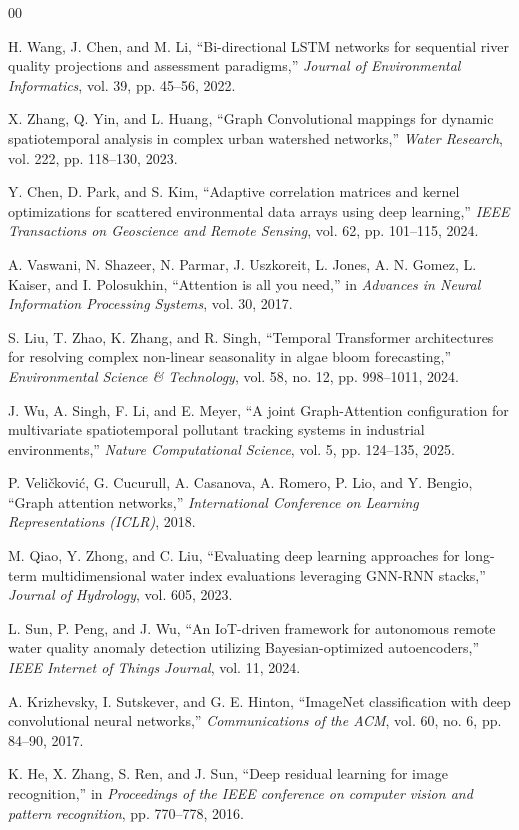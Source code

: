 \documentclass[journal,10pt,twocolumn]{IEEEtran}
\begin{document}
\begin{thebibliography}{00}

 H. Wang, J. Chen, and M. Li, ``Bi-directional LSTM networks for sequential river quality projections and assessment paradigms,'' \textit{Journal of Environmental Informatics}, vol. 39, pp. 45--56, 2022.

 X. Zhang, Q. Yin, and L. Huang, ``Graph Convolutional mappings for dynamic spatiotemporal analysis in complex urban watershed networks,'' \textit{Water Research}, vol. 222, pp. 118--130, 2023.

 Y. Chen, D. Park, and S. Kim, ``Adaptive correlation matrices and kernel optimizations for scattered environmental data arrays using deep learning,'' \textit{IEEE Transactions on Geoscience and Remote Sensing}, vol. 62, pp. 101--115, 2024.

 A. Vaswani, N. Shazeer, N. Parmar, J. Uszkoreit, L. Jones, A. N. Gomez, L. Kaiser, and I. Polosukhin, ``Attention is all you need,'' in \textit{Advances in Neural Information Processing Systems}, vol. 30, 2017.

 S. Liu, T. Zhao, K. Zhang, and R. Singh, ``Temporal Transformer architectures for resolving complex non-linear seasonality in algae bloom forecasting,'' \textit{Environmental Science \& Technology}, vol. 58, no. 12, pp. 998--1011, 2024.

 J. Wu, A. Singh, F. Li, and E. Meyer, ``A joint Graph-Attention configuration for multivariate spatiotemporal pollutant tracking systems in industrial environments,'' \textit{Nature Computational Science}, vol. 5, pp. 124--135, 2025.

 P. Veličković, G. Cucurull, A. Casanova, A. Romero, P. Lio, and Y. Bengio, ``Graph attention networks,'' \textit{International Conference on Learning Representations (ICLR)}, 2018.

 M. Qiao, Y. Zhong, and C. Liu, ``Evaluating deep learning approaches for long-term multidimensional water index evaluations leveraging GNN-RNN stacks,'' \textit{Journal of Hydrology}, vol. 605, 2023.

 L. Sun, P. Peng, and J. Wu, ``An IoT-driven framework for autonomous remote water quality anomaly detection utilizing Bayesian-optimized autoencoders,'' \textit{IEEE Internet of Things Journal}, vol. 11, 2024.

 A. Krizhevsky, I. Sutskever, and G. E. Hinton, ``ImageNet classification with deep convolutional neural networks,'' \textit{Communications of the ACM}, vol. 60, no. 6, pp. 84--90, 2017.

 K. He, X. Zhang, S. Ren, and J. Sun, ``Deep residual learning for image recognition,'' in \textit{Proceedings of the IEEE conference on computer vision and pattern recognition}, pp. 770--778, 2016.

\end{thebibliography}
\end{document}

